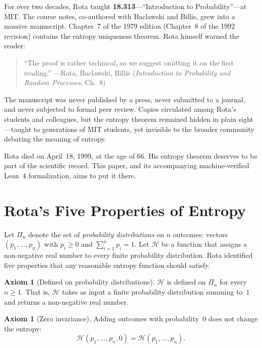 \documentclass[12pt,a4paper]{article}
\theoremstyle{definition}
\newtheorem{axiom_def}[theorem]{Axiom}
\newcommand{\Hfunc}{\mathcal{H}}
\begin{document}
For over two decades, Rota taught \textbf{18.313}---``Introduction to
Probability''---at MIT.  The course notes, co-authored with Baclawski
and Billis, grew into a massive manuscript.  Chapter~7 of the 1979
edition (Chapter~8 of the 1992 revision) contains the entropy uniqueness
theorem.  Rota himself warned the reader:

\begin{quote}
``The proof is rather technical, so we suggest omitting it on the first
reading.'' \hfill ---Rota, Baclawski, Billis (\textit{Introduction to Probability
and Random Processes}, Ch.~8)
\end{quote}

\noindent
The manuscript was never published by a press, never submitted to a
journal, and never subjected to formal peer review.  Copies circulated
among Rota's students and colleagues, but the entropy theorem remained
hidden in plain sight---taught to generations of MIT students, yet
invisible to the broader community debating the meaning of entropy.

Rota died on April~18, 1999, at the age of 66.  His entropy theorem
deserves to be part of the scientific record.  This paper, and its
accompanying machine-verified Lean~4 formalization, aims to put it
there.

\section{Rota's Five Properties of Entropy}
\label{sec:properties}

Let $\Pi_n$ denote the set of \emph{probability distributions} on $n$
outcomes: vectors $(p_1, \dots, p_n)$ with $p_i \geq 0$ and
$\sum_{i=1}^{n} p_i = 1$.  Let $\Hfunc$ be a function that assigns a
non-negative real number to every finite probability distribution.
Rota identified five properties that any reasonable entropy function
should satisfy.

\begin{axiom_def}[Defined on probability distributions]
\label{ax:prob}
$\Hfunc$ is defined on $\Pi_n$ for every $n \geq 1$.  That is, $\Hfunc$
takes as input a finite probability distribution summing to~$1$ and
returns a non-negative real number.
\end{axiom_def}

\begin{axiom_def}[Zero invariance]
\label{ax:zero}
Adding outcomes with probability~$0$ does not change the entropy:
\[
  \Hfunc(p_1, \dots, p_n, 0) = \Hfunc(p_1, \dots, p_n).
\]
\end{axiom_def}
\end{document}
